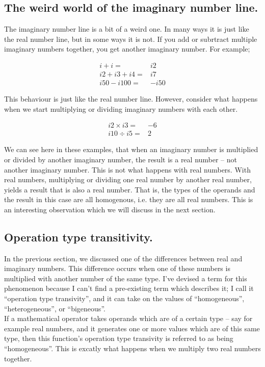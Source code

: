 \documentclass{article}
\begin{document}
\subsection{The weird world of the imaginary number line.}

The imaginary number line is a bit of a weird one. In many ways it is just like the real number line, but in some ways
it is not. If you add or subrtract multiple imaginary numbers together, you get another imaginary number. For example;

\begin{align*}
i + i =& i2 \\
i2 + i3 + i4 =& i7 \\
i50 - i100 =& -i50 
\end{align*}

This behaviour is just like the real number line. However, consider what happens when we start multiplying or dividing
imaginary numbers with each other.

\begin{align*}
i2 \times i3 =& -6 \\
i10 \div i5 =& 2 
\end{align*}

We can see here in these examples, that when an imaginary number is multiplied or divided by another imaginary
number, the result is a real number -- not another imaginary number. This is not what happens with real numbers.
With real numbers, multiplying or dividing one real number by another real number, yields a result that is
also a real number. That is, the types of the operands and the result in this case are all homogenous, i.e. 
they are all real numbers. This is an interesting observation which we will discuss in the next section. 

\subsection{Operation type transitivity.}

In the previous section, we discussed one of the differences between real and imaginary numbers. This difference
occurs when one of these numbers is multiplied with another number of the same type. I've devised a term for this
phenomenon because I can't find a pre-existing term which describes it; I call it ``operation type transivity'', and
it can take on the values of ``homogeneous'', ``heterogeneous'', or ``bigeneous''.\\

If a mathematical operator takes operands which are of a certain type -- say for example real numbers, and it
generates one or more values which are of this same type, then this function's operation type transivity is
referred to as being ``homogeneous''. This is excatly what happens when we multiply two real numbers together.\\
\end{document}
